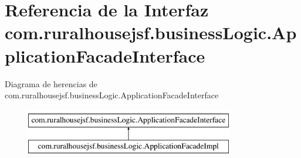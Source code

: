 \hypertarget{a00136}{}\section{Referencia de la Interfaz com.\+ruralhousejsf.\+business\+Logic.\+Application\+Facade\+Interface}
\label{a00136}
Diagrama de herencias de com.\+ruralhousejsf.\+business\+Logic.\+Application\+Facade\+Interface\begin{figure}[H]
\begin{center}
\leavevmode
\includegraphics[height=2.000000cm]{a00136}
\end{center}
\end{figure}
